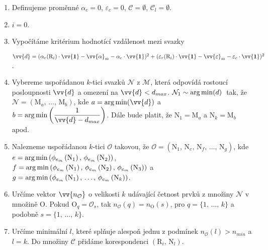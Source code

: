 \begin{enumerate}
\item Definujeme proměnné $\alpha_{c} = 0$, $\varepsilon_{c} = 0$, $\mathcal{C} = \emptyset$, $\mathcal{C}_{l} = \emptyset$.

\item $i = 0$.

\item Vypočítáme kritérium hodnotící vzdálenost mezi svazky 

$\vv{d} = (\alpha_{r}(\mathrm{R}_i)\cdot\vv{\mathbf{1}}-\vv{\alpha}_{m}-\alpha_{c}\cdot\vv{\mathbf{1}})^2 + (\varepsilon_{r}(\mathrm{R}_i)\cdot\vv{\mathbf{1}}-\vv{\varepsilon}_{m}-\varepsilon_{c}\cdot\vv{\mathbf{1}})^2 $.

\item Vybereme uspořádanou $k$-tici svazků $\mathcal{N}$ z $\mathcal{M}$, která odpovídá rostoucí posloupnosti $\vv{d}$ a omezení na $\vv{d} < d_{max}$. $\mathcal{N}_1 \sim \operatorname*{arg\,min}(d)\,$ tak, že $\mathcal{N} = \left(\mathrm{M}_a ,\,\dots,\, \mathrm{M}_b \right)$, kde $a = \argmin(\vv{d})$ a $b = \argmin\left(\dfrac{1}{\vv{d}-d_{max}}\right)$. Dále bude platit, že  $\mathrm{N}_1 = \mathrm{M}_a$ a $\mathrm{N}_k = \mathrm{M}_b$ apod. 

\item Nalezneme uspořádanou $k$-tici $\mathcal{O}$ takovou, že $\mathcal{O} = \left(\mathrm{N}_1 ,\,\mathrm{N}_e,\,\mathrm{N}_f ,\,\dots,\, \mathrm{N}_g \right)$, kde\\$e = \operatorname*{arg\,min}\left( \phi_{e_{m}}\left(\mathrm{N}_1 \right),\, \phi_{e_{m}}\left(\mathrm{N}_2 \right)  \right)$, $f = \operatorname*{arg\,min}\left( \phi_{e_{m}}\left(\mathrm{N}_1 \right),\, \phi_{e_{m}}\left(\mathrm{N}_2 \right),\, \phi_{e_{m}}\left(\mathrm{N}_3 \right)   \right)$ a \\  $g = \operatorname*{arg\,min}\left( \phi_{e_{m}}\left(\mathrm{N}_1 \right),\,\dots,\, \phi_{e_{m}}\left(\mathrm{N}_k \right)  \right)$.  

\item Určíme vektor $\vv{n_\mathcal{O}}$ o velikosti $k$ udávající četnost prvků z množiny $\mathcal{N}$ v množině $\mathrm{O}$. Pokud $\mathrm{O}_q = \mathcal{O}_s$, tak $n_{\mathcal{O}}(q) = n_{\mathrm{O}}(s)$, pro $q = \lbrace1,\,\dots,\,k \rbrace$ a podobně $s = \lbrace 1,\,\dots,\,k \rbrace$.

\item Určíme minimální $l$, které splňuje alespoň jednu z podmínek $n_{\mathcal{O}}(l) > n_{min}$  a $l = k$. Do množiny $\mathcal{C}$ přidáme korespondenci $\left(\mathrm{R}_i,\,\mathrm{N}_l \right)$.


\end{enumerate}
